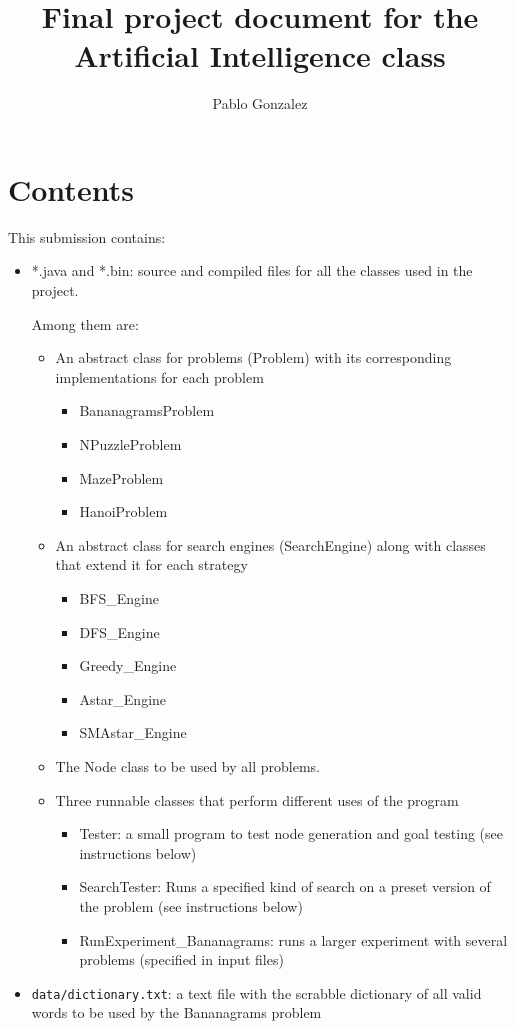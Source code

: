 \documentclass[10pt,letterpaper]{article}
\author{Pablo Gonzalez}
\title{Final project document for the Artificial Intelligence class}
\begin{document}
	\maketitle
	
	\section{Contents}
	
	This submission contains:
	\begin{itemize}
	
	\item *.java and *.bin: source and compiled files for all the classes used in the project. 
	
	Among them are:
	\begin{itemize} 
	\item An abstract class for problems (Problem) with its corresponding implementations for each problem 
	\begin{itemize}
	\item BananagramsProblem
	\item NPuzzleProblem
	\item MazeProblem
	\item HanoiProblem
	\end{itemize}
	\item An abstract class for search engines (SearchEngine) along with classes that extend it for each strategy
	\begin{itemize}
	\item BFS\_Engine
	\item DFS\_Engine
	\item Greedy\_Engine
	\item Astar\_Engine
	\item SMAstar\_Engine
	\end{itemize}
	\item The Node class to be used by all problems.
	
	
	\item Three runnable classes that perform different uses of the program
	\begin{itemize}
	\item Tester: a small program to test node generation and goal testing (see instructions below)
	\item SearchTester: Runs a specified kind of search on a preset version of the problem (see instructions below)
	\item RunExperiment\_Bananagrams: runs a larger experiment with several problems (specified in input files) 
	\end{itemize}
	\end{itemize}
	\item \lstinline!data/dictionary.txt!: a text file with the scrabble dictionary of all valid words to be used by the Bananagrams problem
	

\end{itemize}
\end{document}
